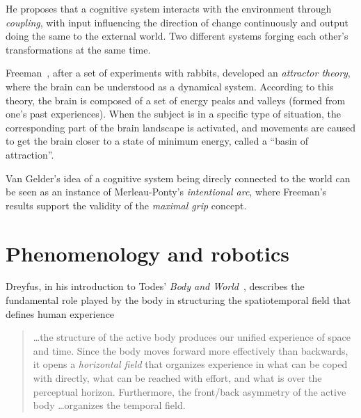 \documentclass{article}
\begin{document}
He proposes that a cognitive system interacts with the environment through
\emph{coupling}, with input influencing the direction of change continuously and
output doing the same to the external world. Two different systems forging each
other's transformations at the same time.

Freeman~\cite{freeman1991}, after a set of experiments with rabbits, developed
an \emph{attractor theory}, where the brain can be understood as a dynamical 
system. According to this theory, the brain is composed of a set of energy peaks
and valleys (formed from one's past experiences). When the subject is in a
specific type of situation, the corresponding part of the brain landscape is
activated, and movements are caused to get the brain closer to a state of
minimum energy, called a ``basin of attraction''.

Van Gelder's idea of a cognitive system being direcly connected to the world can
be seen as an instance of Merleau-Ponty's \emph{intentional arc}, where
Freeman's results support the validity of the \emph{maximal grip} concept.


\section{Phenomenology and robotics}


Dreyfus, in his introduction to Todes' \emph{Body and World}~\cite{todes2001},
describes the fundamental role played by the body in structuring the
spatiotemporal field that defines human experience

\begin{quotation}
  \dots the structure of the active body produces our unified experience of
  space and time. Since the body moves forward more effectively than backwards,
  it opens a \emph{horizontal field} that organizes experience in what can be
  coped with directly, what can be reached with effort, and what is over the
  perceptual horizon. Furthermore, the front/back asymmetry of the active body
  \dots organizes the temporal field.
\end{quotation}

\end{document}
